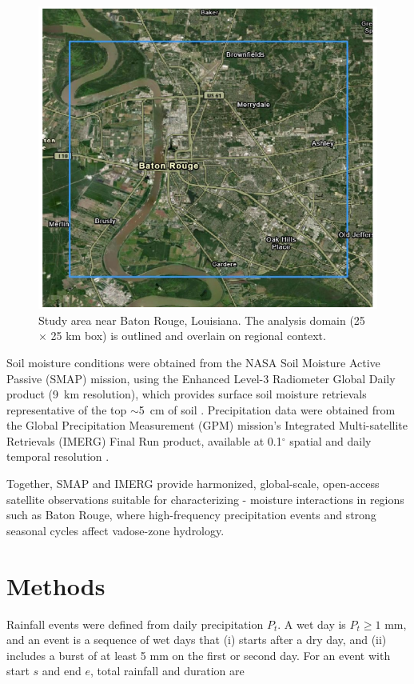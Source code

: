 \documentclass[8pt, twocolumn]{extarticle}
\begin{document}
\begin{figure}[!htbp]
  \centering
  \includegraphics[width=0.95\columnwidth]{map}
  \caption{Study area near Baton Rouge, Louisiana. The analysis domain (25 $\times$ 25 km box) is outlined and overlain on regional context.}
  \label{fig:map}
\end{figure}

Soil moisture conditions were obtained from the NASA Soil Moisture Active Passive (SMAP) mission, using the Enhanced Level-3 Radiometer Global Daily product (9~km resolution), which provides surface soil moisture retrievals representative of the top $\sim$5~cm of soil \cite{smap}. Precipitation data were obtained from the Global Precipitation Measurement (GPM) mission's Integrated Multi-satellite Retrievals (IMERG) Final Run product, available at 0.1$^{\circ}$ spatial and daily temporal resolution \cite{imergdp}.

Together, SMAP and IMERG provide harmonized, global-scale, open-access satellite observations suitable for characterizing - moisture interactions in regions such as Baton Rouge, where high-frequency precipitation events and strong seasonal cycles affect vadose-zone hydrology.

\section{Methods}

Rainfall events were defined from daily precipitation \(P_t\). A wet day is \(P_t \geq 1\) mm, and an event is a sequence of wet days that (i) starts after a dry day, and (ii) includes a burst of at least 5 mm on the first or second day. For an event with start \(s\) and end \(e\), total rainfall and duration are  
\end{document}
